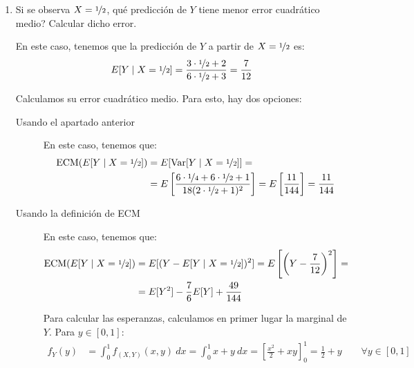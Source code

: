 \begin{ejercicio}
\begin{enumerate}
        \item Si se observa $X = \nicefrac{1}{2}$, qué predicción de $Y$ tiene menor error cuadrático medio? Calcular dicho error.
        
        En este caso, tenemos que la predicción de $Y$ a partir de $X = \nicefrac{1}{2}$ es:
        \begin{equation*}
            E[Y\mid X = \nicefrac{1}{2}] = \dfrac{3\cdot \nicefrac{1}{2}+2}{6\cdot \nicefrac{1}{2}+3} = \dfrac{7}{12}
        \end{equation*}

        Calculamos su error cuadrático medio. Para esto, hay dos opciones:
        \begin{description}
            \item[Usando el apartado anterior] En este caso, tenemos que:
            \begin{align*}
                \text{ECM}(E[Y\mid X = \nicefrac{1}{2}]) &= E[\operatorname{Var}[Y\mid X = \nicefrac{1}{2}]]
                =\\&= E\left[\dfrac{6\cdot \nicefrac{1}{4}+6\cdot \nicefrac{1}{2}+1}{18(2\cdot \nicefrac{1}{2}+1)^2}\right] = E\left[\dfrac{11}{144}\right]
                = \dfrac{11}{144}
            \end{align*}

            \item[Usando la definición de ECM] En este caso, tenemos que:
            \begin{align*}
                \text{ECM}(E[Y\mid X = \nicefrac{1}{2}]) &= E[(Y-E[Y\mid X = \nicefrac{1}{2}])^2]
                = E\left[\left(Y-\dfrac{7}{12}\right)^2\right]
                =\\&= E[Y^2]-\dfrac{7}{6}E[Y]+\dfrac{49}{144}
            \end{align*}

            Para calcular las esperanzas, calculamos en primer lugar la marginal de $Y$. Para $y\in [0,1]$:
            \begin{align*}
                f_Y(y) &= \int_{0}^{1} f_{(X,Y)}(x, y) \ dx
                = \int_{0}^{1} x+y \ dx
                = \left[\frac{x^2}{2}+xy\right]_{0}^{1}
                = \frac{1}{2}+y \qquad \forall y\in[0,1]
            \end{align*}


\end{description}
\end{enumerate}
\end{ejercicio}
